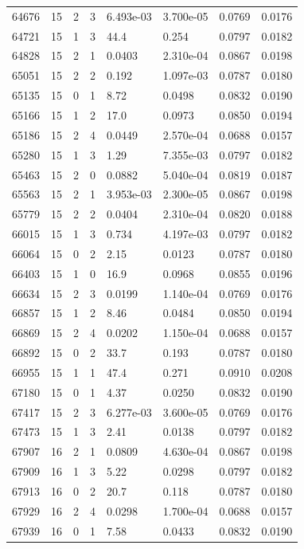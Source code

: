 \documentclass[preview]{standalone}
\begin{document}
{{{{{\begin{tabular}{L{1.2cm}C{1.2cm} C{0.3cm}C{0.5cm} C{1.4cm}C{1.4cm} C{1.4cm}C{1.4cm}}
  64676  &    15  & 2     &  3 &  6.493e-03  & 3.700e-05  & 0.0769 &  0.0176   \\ 
  64721  &    15  & 1     &  3 &  44.4  & 0.254  & 0.0797 &  0.0182   \\ 
  64828  &    15  & 2     &  1 &  0.0403  & 2.310e-04  & 0.0867 &  0.0198   \\ 
  65051  &    15  & 2     &  2 &  0.192  & 1.097e-03  & 0.0787 &  0.0180   \\ 
  65135  &    15  & 0     &  1 &  8.72  & 0.0498  & 0.0832 &  0.0190   \\ 
  65166  &    15  & 1     &  2 &  17.0  & 0.0973  & 0.0850 &  0.0194   \\ 
  65186  &    15  & 2     &  4 &  0.0449  & 2.570e-04  & 0.0688 &  0.0157   \\ 
  65280  &    15  & 1     &  3 &  1.29  & 7.355e-03  & 0.0797 &  0.0182   \\ 
  65463  &    15  & 2     &  0 &  0.0882  & 5.040e-04  & 0.0819 &  0.0187   \\ 
  65563  &    15  & 2     &  1 &  3.953e-03  & 2.300e-05  & 0.0867 &  0.0198   \\ 
  65779  &    15  & 2     &  2 &  0.0404  & 2.310e-04  & 0.0820 &  0.0188   \\ 
  66015  &    15  & 1     &  3 &  0.734  & 4.197e-03  & 0.0797 &  0.0182   \\ 
  66064  &    15  & 0     &  2 &  2.15  & 0.0123  & 0.0787 &  0.0180   \\ 
  66403  &    15  & 1     &  0 &  16.9  & 0.0968  & 0.0855 &  0.0196   \\ 
  66634  &    15  & 2     &  3 &  0.0199  & 1.140e-04  & 0.0769 &  0.0176   \\ 
  66857  &    15  & 1     &  2 &  8.46  & 0.0484  & 0.0850 &  0.0194   \\ 
  66869  &    15  & 2     &  4 &  0.0202  & 1.150e-04  & 0.0688 &  0.0157   \\ 
  66892  &    15  & 0     &  2 &  33.7  & 0.193  & 0.0787 &  0.0180   \\ 
  66955  &    15  & 1     &  1 &  47.4  & 0.271  & 0.0910 &  0.0208   \\ 
  67180  &    15  & 0     &  1 &  4.37  & 0.0250  & 0.0832 &  0.0190   \\ 
  67417  &    15  & 2     &  3 &  6.277e-03  & 3.600e-05  & 0.0769 &  0.0176   \\ 
  67473  &    15  & 1     &  3 &  2.41  & 0.0138  & 0.0797 &  0.0182   \\ 
  67907  &    16  & 2     &  1 &  0.0809  & 4.630e-04  & 0.0867 &  0.0198   \\ 
  67909  &    16  & 1     &  3 &  5.22  & 0.0298  & 0.0797 &  0.0182   \\ 
  67913  &    16  & 0     &  2 &  20.7  & 0.118  & 0.0787 &  0.0180   \\ 
  67929  &    16  & 2     &  4 &  0.0298  & 1.700e-04  & 0.0688 &  0.0157   \\ 
  67939  &    16  & 0     &  1 &  7.58  & 0.0433  & 0.0832 &  0.0190   \\ 
\hline 
\end{tabular} 

}}}}}
\end{document}
